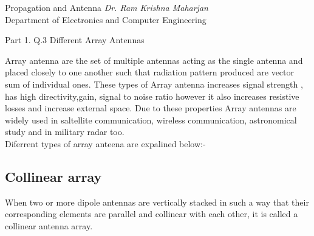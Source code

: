 \documentclass[a4paper,12pt]{article}
\begin{document}
{ Propagation and Antenna}
{\textit{Dr. Ram Krishna Maharjan}\\Department of Electronics and Computer Engineering}

\tableofcontents
\pagebreak
\listoffigures
\pagebreak
{}

\begin{Q}
    {
        Part 1. Q.3 Different Array Antennas
    }
\end{Q}

\begin{A}
    { Array antenna are the set of multiple antennas acting as the single antenna and placed closely to one another such that
        radiation pattern produced are vector sum of individual ones. These types of Array antenna increases signal strength ,
        has high directivity,gain, signal to noise ratio however it also increases resistive losses and increase external space.
        Due to these properties Array antennas are widely used in  saltellite communication, wireless communication,
        astronomical study  and in military radar too.\\

        Diferrent types of array anteena are expalined below:-

        \subsection{Collinear array}
        When two or more dipole antennas are vertically stacked in such a way that their corresponding elements are parallel and collinear with each other,
        it is called a collinear antenna array.

}
\end{A}
\end{document}
